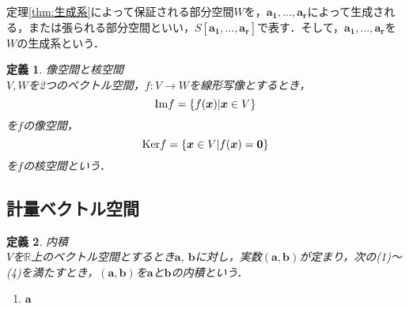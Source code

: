 \documentclass[uplatex]{jsarticle}
\newtheorem{definition}{定義}
\begin{document}
定理\ref{thm:生成系}によって保証される部分空間$W$を，$\bm{a_1}, ... , \bm{a_r}$によって生成される，または張られる部分空間といい，$S[\bm{a_1}, ..., \bm{a_r}]$で表す．そして，$\bm{a_1}, ..., \bm{a_r}$を$W$の生成系という．

\begin{definition}
    像空間と核空間\\
    $V, W$を2つのベクトル空間，$f:V \to W$を線形写像とするとき，$${\rm Im} f = \{f(\bm{x}) | \bm{x} \in V\}$$を$f$の像空間，$${\rm Ker} f = \{\bm{x} \in V | f(\bm{x}) = \bm{0}\}$$を$f$の核空間という．
\end{definition}

\subsection{計量ベクトル空間}
\begin{definition}
    内積\\
    $V$を$\mathbb{R}$上のベクトル空間とするとき$\bm{a}$, $\bm{b}$に対し，実数$(\bm{a}, \bm{b})$が定まり，次の(1)〜(4)を満たすとき，$(\bm{a}, \bm{b})$を$\bm{a}$と$\bm{b}$の内積という．
    \begin{enumerate}
        \item $\bm{a}$
    \end{enumerate}
\end{definition}
\end{document}
